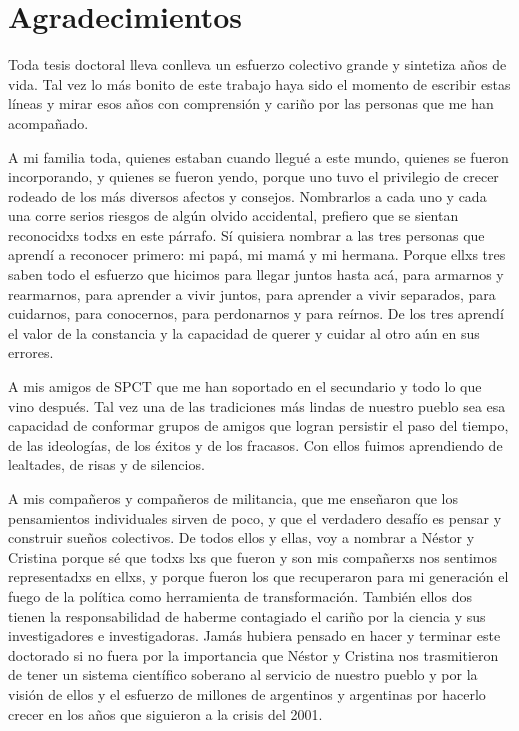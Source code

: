 \chapter*{Agradecimientos}
Toda tesis doctoral lleva conlleva un esfuerzo colectivo grande y sintetiza años de vida. Tal vez lo más bonito de este trabajo haya sido el momento de escribir estas líneas y mirar esos años con comprensión y cariño por las personas que me han acompañado.

A mi familia toda, quienes estaban cuando llegué a este mundo, quienes se fueron incorporando, y quienes se fueron yendo, porque uno tuvo el privilegio de crecer rodeado de los más diversos afectos y consejos. Nombrarlos a cada uno y cada una corre serios riesgos de algún olvido accidental, prefiero que se sientan reconocidxs todxs en este párrafo. Sí quisiera nombrar a las tres personas que aprendí a reconocer primero: mi papá, mi mamá y mi hermana. Porque ellxs tres saben todo el esfuerzo que hicimos para llegar juntos hasta acá, para armarnos y rearmarnos, para aprender a vivir juntos, para aprender a vivir separados, para cuidarnos, para conocernos, para perdonarnos y para reírnos. De los tres aprendí el valor de la constancia y la capacidad de querer y cuidar al otro aún en sus errores. 

A mis amigos de SPCT que me han soportado en el secundario y todo lo que vino después. Tal vez una de las tradiciones más lindas de nuestro pueblo sea esa capacidad de conformar grupos de amigos que logran persistir el paso del tiempo, de las ideologías, de los éxitos y de los fracasos. Con ellos fuimos aprendiendo de lealtades, de risas y de silencios.

A mis compañeros y compañeros de militancia, que me enseñaron que los pensamientos individuales sirven de poco, y que el verdadero desafío es pensar y construir sueños colectivos. De todos ellos y ellas, voy a nombrar a Néstor y Cristina porque sé que todxs lxs que fueron y son mis compañerxs nos sentimos representadxs en ellxs, y porque fueron los que recuperaron para mi generación el fuego de la política como herramienta de transformación. También ellos dos tienen la responsabilidad de haberme contagiado el cariño por la ciencia y sus investigadores e investigadoras. Jamás hubiera pensado en hacer y terminar este doctorado si no fuera por la importancia que Néstor y Cristina nos trasmitieron de tener un sistema científico soberano al servicio de nuestro pueblo y por la visión de ellos y el esfuerzo de millones de argentinos y argentinas por hacerlo crecer en los años que siguieron a la crisis del 2001.

